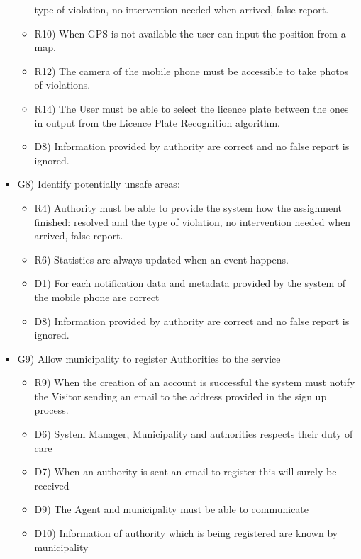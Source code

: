 \begin{itemize}
\begin{itemize}
type of violation, no intervention needed when arrived, false report.
 \item R10) When GPS is not available the user can input the position from a map.
 \item R12) The camera of the mobile phone must be accessible to take photos of violations.
 \item R14) The User must be able to select the licence plate between the ones in output from the Licence
Plate Recognition algorithm.
 \item D8) Information provided by authority are correct and no false report is ignored.

\end{itemize}
\item G8) Identify potentially unsafe areas:
\begin{itemize}
\item R4) Authority must be able to provide the system how the assignment finished: resolved and the
type of violation, no intervention needed when arrived, false report.
\item R6) Statistics are always updated when an event happens.
\item D1) For each notification data and metadata provided by the system of the mobile phone are
correct
\item D8) Information provided by authority are correct and no false report is ignored.

\end{itemize}
\item G9) Allow municipality to register Authorities to the service
\begin{itemize}
\item R9) When the creation of an account is successful the system must notify the Visitor sending an
email to the address provided in the sign up process.
\item D6) System Manager, Municipality and authorities respects their duty of care
\item D7) When an authority is sent an email to register this will surely be received
\item D9) The Agent and municipality must be able to communicate
\item D10) Information of authority which is being registered are known by municipality
\end{itemize}
\end{itemize}

